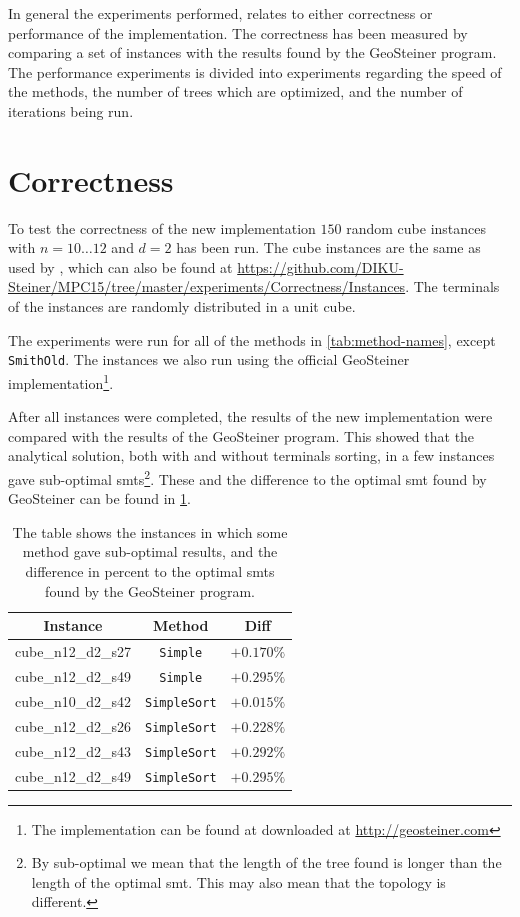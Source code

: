 In general the experiments performed, relates to either
correctness or performance of the implementation. The correctness has been
measured by comparing a set of instances with the results found by the
GeoSteiner program. The performance experiments is divided into experiments
regarding the speed of the methods, the number of trees which are optimized, and
the number of iterations being run. 

\section{Correctness}
\label{sec:correctness}

To test the correctness of the new implementation $150$ random cube instances
with $n = 10 \ldots 12$ and $d = 2$ has been run. The cube instances are the
same as used by \textcite{fonseca2014}, which can also be found at
\url{https://github.com/DIKU-Steiner/MPC15/tree/master/experiments/Correctness/Instances}.
The terminals of the instances are randomly distributed in a unit cube.

The experiments were run for all of the methods in \cref{tab:method-names},
except \texttt{SmithOld}. The instances we also run using the official
GeoSteiner implementation\footnote{The implementation can be found at downloaded
  at \url{http://geosteiner.com}}.

After all instances were completed, the results of the new implementation were
compared with the results of the GeoSteiner program. This showed that the
analytical solution, both with and without terminals sorting, in a few instances
gave sub-optimal \acp{smt}\footnote{By sub-optimal we mean that the length of
  the tree found is longer than the length of the optimal \ac{smt}. This may also
  mean that the topology is different.}. These and the difference to the optimal
\ac{smt} found by GeoSteiner can be found in \cref{tab:correctness-errors}.

\begin{table}[htbp]
  \centering
  \begin{tabular}{ccc}
    \toprule
    Instance           & Method              & Diff       \\
    \midrule
    cube\_n12\_d2\_s27 & \texttt{Simple}     & $+0.170\%$ \\
    cube\_n12\_d2\_s49 & \texttt{Simple}     & $+0.295\%$ \\
    cube\_n10\_d2\_s42 & \texttt{SimpleSort} & $+0.015\%$ \\
    cube\_n12\_d2\_s26 & \texttt{SimpleSort} & $+0.228\%$ \\
    cube\_n12\_d2\_s43 & \texttt{SimpleSort} & $+0.292\%$ \\
    cube\_n12\_d2\_s49 & \texttt{SimpleSort} & $+0.295\%$ \\
    \bottomrule
  \end{tabular}
  \caption[Sub-optimal results in correctness test]{The table shows the
    instances in which some method gave sub-optimal results, and the difference
    in percent to the optimal \acp{smt} found by the GeoSteiner
    program.\label{tab:correctness-errors}}
\end{table}

